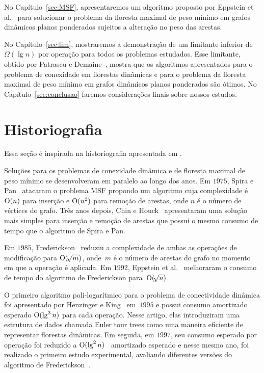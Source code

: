No Capítulo~\ref{sec:MSF}, apresentaremos um algoritmo proposto por Eppstein et al.~\cite{EPPSTEIN-planar} para solucionar o problema da floresta maximal de peso mínimo em grafos dinâmicos planos ponderados sujeitos a alteração no peso das arestas.

No Capítulo~\ref{sec:lim}, mostraremos a demonstração de um limitante inferior de~$\Omega(\lg n)$ por operação para todos os problemas estudados.
Esse limitante, obtido por Patrascu e Demaine~\cite{lowerBoundPatrascu}, mostra que os algoritmos apresentados para o problema de conexidade em florestas dinâmicas e para o problema da floresta maximal de peso mínimo em grafos dinâmicos planos ponderados são ótimos.
No Capítulo~\ref{sec:conclusao} faremos considerações finais sobre nossos estudos.

\newpage
\section{Historiografia}

Essa seção é inspirada na historiografia apresentada em \cite{HHSRecentAdvances2022, Zaroliagis2002}.

Soluções para os problemas de conexidade dinâmica e de floresta maximal de peso mínimo se desenvolveram em paralelo ao longo dos anos. Em $1975$, Spira e Pan~\cite{SP1975} atacaram o problema MSF propondo um algoritmo cuja complexidade é $\mathrm{O}(n)$ para inserção e $\mathrm{O}(n^2)$ para remoção de arestas, onde $n$ é o número de vértices do grafo. Três anos depois, Chin e Houck~\cite{CH1978} apresentaram uma solução mais simples para inserção e remoção de arestas que possui o mesmo consumo de tempo que o algoritmo de Spira e Pan.

Em $1985$, Frederickson~\cite{frederickson1983data} reduziu a complexidade de ambas as operações de modificação para $\mathrm{O}(\!\sqrt{m})$, onde~$m$ é o número de arestas do grafo no momento em que a operação é aplicada.
Em $1992$, Eppstein et al.~\cite{Eppstein1992SparsificationaTF,Eppstein1997SparsificationaTF} melhoraram o consumo de tempo do algoritmo de Frederickson para~$\mathrm{O}(\!\sqrt{n})$.

O primeiro algoritmo poli-logarítmico para o problema de conectividade dinâmica foi apresentado por Henzinger e King~\cite{HenzingerKing} em~$1995$ e possui consumo amortizado esperado $\mathrm{O}(\lg^3 n)$ para cada operação. Nesse artigo, elas introduziram uma estrutura de dados chamada Euler tour trees como uma maneira eficiente de representar florestas dinâmicas.
Em seguida, em $1997$, seu consumo esperado por operação foi reduzido a $\mathrm{O}(\lg^2 n)$~\cite{HenzingerThorup} amortizado esperado e nesse mesmo ano, foi realizado o primeiro estudo experimental, avaliando diferentes versões do algoritmo de Frederickson~\cite{xpAnalyGiuseppe}.

